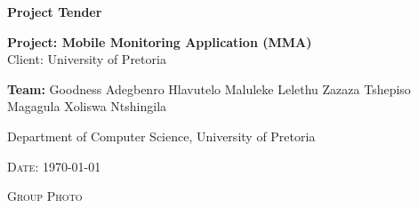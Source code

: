 \begin{titlepage}
	\begin{center}
		
		\textbf{\huge Project Tender } \\
		\vfill

		\textbf{\large Project: Mobile Monitoring Application (MMA)} \\
		{\large Client: University of Pretoria} \\ 
		
		
		\begin{flushright} \large
			\textbf{Team:}\newline
			Goodness Adegbenro\newline
			Hlavutelo Maluleke\newline
			Lelethu Zazaza\newline
			Tshepiso Magagula\newline
			Xoliswa Ntshingila\newline
		\end{flushright}
		{\large Department of Computer Science, University of Pretoria } \\ 
		
	

		\vfill

		

		\textsc{\large Date: \today}	

		\vfill
	
		\textsc{\large Group Photo } \\ 	
		
		
	\end{center}
\end{titlepage}
